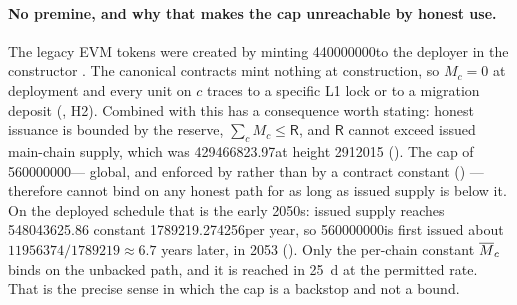\paragraph{No premine, and why that makes the cap unreachable by honest use.} The legacy EVM tokens
were created by minting \num{440000000}\flux to the deployer in the constructor
. The canonical contracts mint nothing at construction, so
$M_c = 0$ at deployment and every unit on $c$ traces to a specific L1 lock or to a migration deposit
(, H2). Combined with  this has a consequence worth
stating: honest issuance is bounded by the reserve, $\sum_c M_c \le \mathsf{R}$, and $\mathsf{R}$
cannot exceed issued main-chain supply, which was \num{429466823.97}\flux at height \num{2912015}
 (). The cap of
\num{560000000}\flux --- global, and enforced by  rather than by a
contract constant () --- therefore cannot bind on any honest path for as long as
issued supply is below it. On the deployed schedule that is the early 2050s: issued supply reaches \num{548043625.86}\flux
{}
constant \num{1789219.274256}\flux per year, so \num{560000000}\flux is first issued about
$\num{11956374}/\num{1789219} \approx 6.7$ years later, in 2053 \srcinferred
(). Only the per-chain constant $\overline{M}_{c}$ binds on the unbacked path, and it
is reached in \SI{25}{\day} at the permitted rate. That is the precise sense in which the cap is a backstop and not
a bound.


